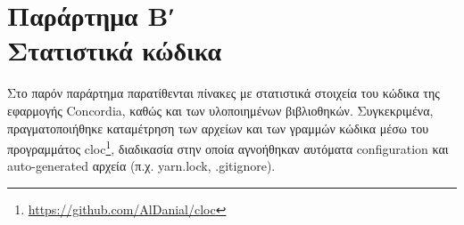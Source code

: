 \chapter*{Παράρτημα Βʹ\\[20pt]Στατιστικά κώδικα}\label{appendix-b}


\captionsetup{labelformat=AppendixBTables}
\setcounter{table}{0}

Στο παρόν παράρτημα παρατίθενται πίνακες με στατιστικά στοιχεία του κώδικα της εφαρμογής Concordia, καθώς και των υλοποιημένων βιβλιοθηκών. Συγκεκριμένα, πραγματοποιήθηκε καταμέτρηση των αρχείων και των γραμμών κώδικα μέσω του προγραμμάτος cloc\footnote{\url{https://github.com/AlDanial/cloc}}, διαδικασία στην οποία αγνοήθηκαν αυτόματα configuration και auto-generated αρχεία (π.χ. yarn.lock, .gitignore).

